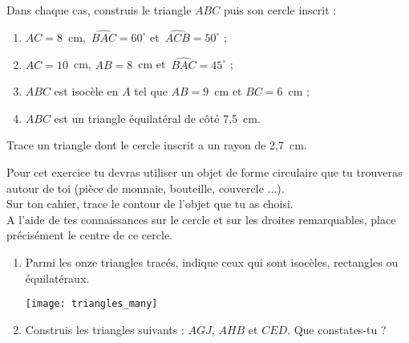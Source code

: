 \begin{exercice}
Dans chaque cas, construis le triangle $ABC$ puis son cercle inscrit :
\begin{enumerate}
 \item $AC = 8$ cm, $\widehat{BAC} = 60^\circ$ et $\widehat{ACB} = 50^\circ$ ;
 \item $AC = 10$ cm, $AB = 8$ cm et $\widehat{BAC} = 45^\circ$ ;
 \item $ABC$ est isocèle en $A$ tel que $AB = 9$ cm et $BC = 6$ cm ;
 \item $ABC$ est un triangle équilatéral de côté 7,5 cm.
 \end{enumerate}
\end{exercice}


\begin{exercice}
Trace un triangle dont le cercle inscrit a un rayon de 2,7 cm.
\end{exercice}

\begin{exercice}
Pour cet exercice tu devras utiliser un objet de forme circulaire que tu trouveras autour de toi (pièce de monnaie, bouteille, couvercle ...).\\
Sur ton cahier, trace le contour de l'objet que tu as choisi.\\
A l'aide de tes connaissances sur le cercle et sur les droites remarquables, place précisément le centre de ce cercle.
\end{exercice}

\begin{exercice}
\begin{enumerate}
 \item Parmi les onze triangles tracés, indique ceux qui sont isocèles, rectangles ou équilatéraux.
 \begin{center} \texttt{[image: triangles\_many]} \end{center}
 \item Construis les triangles suivants : $AGJ$, $AHB$ et $CED$. Que constates-tu ?
 \end{enumerate}
\end{exercice}
